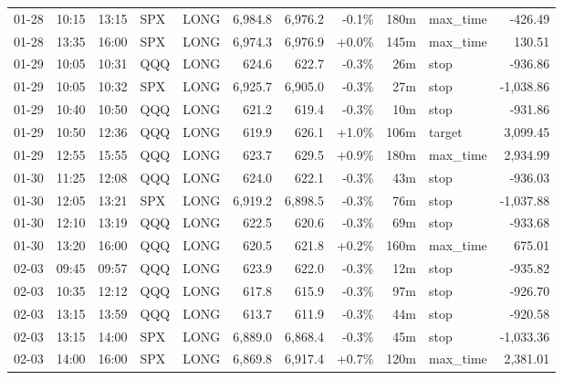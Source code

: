 \documentclass[11pt,a4paper,twoside]{article}
\begin{document}
\begin{center}
\begin{longtable}{>{\color{txtmain}}l l l l l r r r r >{\color{txtmain}}l r}
01-28 & 10:15 & 13:15 & SPX & LONG & 6,984.8 & 6,976.2 & \textcolor{lossred}{-0.1\%} & 180m & max\_time & \textcolor{lossred}{-426.49} \\
01-28 & 13:35 & 16:00 & SPX & LONG & 6,974.3 & 6,976.9 & \textcolor{wingreen}{+0.0\%} & 145m & max\_time & \textcolor{wingreen}{130.51} \\
01-29 & 10:05 & 10:31 & QQQ & LONG & 624.6 & 622.7 & \textcolor{lossred}{-0.3\%} & 26m & stop & \textcolor{lossred}{-936.86} \\
01-29 & 10:05 & 10:32 & SPX & LONG & 6,925.7 & 6,905.0 & \textcolor{lossred}{-0.3\%} & 27m & stop & \textcolor{lossred}{-1,038.86} \\
01-29 & 10:40 & 10:50 & QQQ & LONG & 621.2 & 619.4 & \textcolor{lossred}{-0.3\%} & 10m & stop & \textcolor{lossred}{-931.86} \\
01-29 & 10:50 & 12:36 & QQQ & LONG & 619.9 & 626.1 & \textcolor{wingreen}{+1.0\%} & 106m & target & \textcolor{wingreen}{3,099.45} \\
01-29 & 12:55 & 15:55 & QQQ & LONG & 623.7 & 629.5 & \textcolor{wingreen}{+0.9\%} & 180m & max\_time & \textcolor{wingreen}{2,934.99} \\
01-30 & 11:25 & 12:08 & QQQ & LONG & 624.0 & 622.1 & \textcolor{lossred}{-0.3\%} & 43m & stop & \textcolor{lossred}{-936.03} \\
01-30 & 12:05 & 13:21 & SPX & LONG & 6,919.2 & 6,898.5 & \textcolor{lossred}{-0.3\%} & 76m & stop & \textcolor{lossred}{-1,037.88} \\
01-30 & 12:10 & 13:19 & QQQ & LONG & 622.5 & 620.6 & \textcolor{lossred}{-0.3\%} & 69m & stop & \textcolor{lossred}{-933.68} \\
01-30 & 13:20 & 16:00 & QQQ & LONG & 620.5 & 621.8 & \textcolor{wingreen}{+0.2\%} & 160m & max\_time & \textcolor{wingreen}{675.01} \\
02-03 & 09:45 & 09:57 & QQQ & LONG & 623.9 & 622.0 & \textcolor{lossred}{-0.3\%} & 12m & stop & \textcolor{lossred}{-935.82} \\
02-03 & 10:35 & 12:12 & QQQ & LONG & 617.8 & 615.9 & \textcolor{lossred}{-0.3\%} & 97m & stop & \textcolor{lossred}{-926.70} \\
02-03 & 13:15 & 13:59 & QQQ & LONG & 613.7 & 611.9 & \textcolor{lossred}{-0.3\%} & 44m & stop & \textcolor{lossred}{-920.58} \\
02-03 & 13:15 & 14:00 & SPX & LONG & 6,889.0 & 6,868.4 & \textcolor{lossred}{-0.3\%} & 45m & stop & \textcolor{lossred}{-1,033.36} \\
02-03 & 14:00 & 16:00 & SPX & LONG & 6,869.8 & 6,917.4 & \textcolor{wingreen}{+0.7\%} & 120m & max\_time & \textcolor{wingreen}{2,381.01} \\

\end{longtable}
\end{center}
\end{document}
